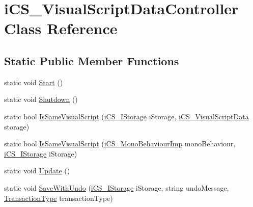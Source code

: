 \hypertarget{classi_c_s___visual_script_data_controller}{\section{i\+C\+S\+\_\+\+Visual\+Script\+Data\+Controller Class Reference}
\label{classi_c_s___visual_script_data_controller}
}
\subsection*{Static Public Member Functions}
\begin{DoxyCompactItemize}
\item 
static void \hyperlink{classi_c_s___visual_script_data_controller_a47fb229ac7127f34d83f475f5406ddd3}{Start} ()
\item 
static void \hyperlink{classi_c_s___visual_script_data_controller_a8ae8698c451c24e1da0c73a64d8a794a}{Shutdown} ()
\item 
static bool \hyperlink{classi_c_s___visual_script_data_controller_a2588f4185ae14aed0323eb650b1f6003}{Is\+Same\+Visual\+Script} (\hyperlink{classi_c_s___i_storage}{i\+C\+S\+\_\+\+I\+Storage} i\+Storage, \hyperlink{classi_c_s___visual_script_data}{i\+C\+S\+\_\+\+Visual\+Script\+Data} storage)
\item 
static bool \hyperlink{classi_c_s___visual_script_data_controller_aec29ffbeff2f08850331f3af9efdf31d}{Is\+Same\+Visual\+Script} (\hyperlink{classi_c_s___mono_behaviour_imp}{i\+C\+S\+\_\+\+Mono\+Behaviour\+Imp} mono\+Behaviour, \hyperlink{classi_c_s___i_storage}{i\+C\+S\+\_\+\+I\+Storage} i\+Storage)
\item 
static void \hyperlink{classi_c_s___visual_script_data_controller_a0e23f919f1a7f54c1478aed6a10cd007}{Update} ()
\item 
static void \hyperlink{classi_c_s___visual_script_data_controller_a087eb782d1823bca9c0e8b6cb191f989}{Save\+With\+Undo} (\hyperlink{classi_c_s___i_storage}{i\+C\+S\+\_\+\+I\+Storage} i\+Storage, string undo\+Message, \hyperlink{i_c_s___i_storage___storage_mgmt_8cs_aa7a2e64697569804f14626bbb2649a58}{Transaction\+Type} transaction\+Type)
\end{DoxyCompactItemize}
